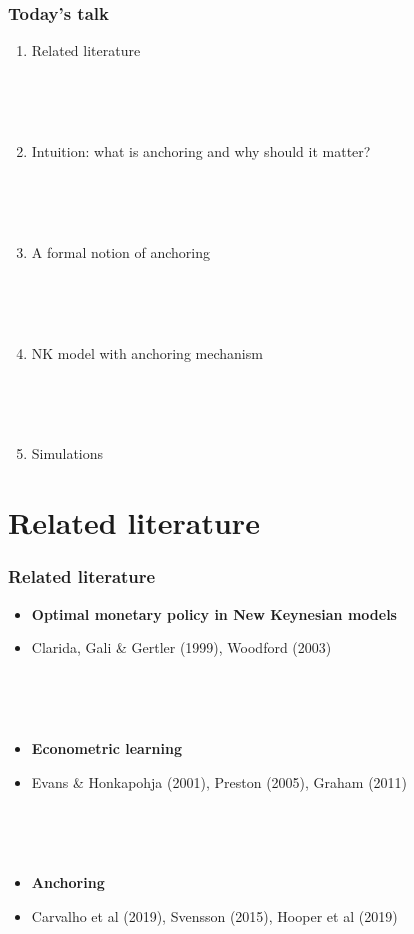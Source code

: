 \documentclass{beamer}
\begin{document}
\begin{frame}
	\frametitle{Today's talk}
	
	\begin{enumerate}
	\item Related literature
		
	\
	
	\
	
	\item Intuition: what is anchoring and why should it matter?
	
	\
	
	\
	
	\item A formal notion of anchoring
	
	
	\
	
	\
	
	\item NK model with anchoring mechanism
	
	\
	
	\
	
	\item Simulations
	
	\end{enumerate}


\end{frame}

\section{Related literature}
\begin{frame}
	\frametitle{Related literature}

\begin{itemize}
\item \textbf{Optimal monetary policy in New Keynesian models}
\item[] Clarida, Gali \& Gertler (1999), Woodford (2003)

\

\

\item \textbf{Econometric learning}
\item[] Evans \& Honkapohja (2001), Preston (2005), Graham (2011)

\

\

\item \textbf{Anchoring} 
\item[] Carvalho et al (2019), Svensson (2015), Hooper et al (2019)
\end{itemize}



\end{frame}
\end{document}
